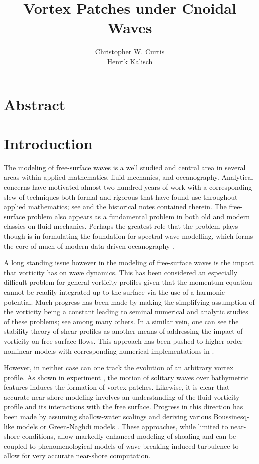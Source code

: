 \documentclass[a4paper,11pt]{article}
\title{Vortex Patches under Cnoidal Waves}
\author{Christopher W. Curtis\\
Henrik Kalisch}
\date{}
\begin{document}
\maketitle
\section*{Abstract}

\section{Introduction}
The modeling of free-surface waves is a well studied and central area in several areas within applied mathematics, fluid mechanics, and oceanography.  Analytical concerns have motivated almost two-hundred years of work with a corresponding slew of techniques both formal and rigorous that have found use throughout applied mathematics; see \cite{constantin} and the historical notes contained therein.  The free-surface problem also appears as a fundamental problem in both old \cite{lamb} and modern \cite{kundu} classics on fluid mechanics. Perhaps the greatest role that the problem plays though is in formulating the foundation for spectral-wave modelling, which forms the core of much of modern data-driven oceanography \cite{holthuijsen}.

A long standing issue however in the modeling of free-surface waves is the impact that vorticity has on wave dynamics.  This has been considered an especially difficult problem for general vorticity profiles given that the momentum equation cannot be readily integrated up to the surface via the use of a harmonic potential.  Much progress has been made by making the simplifying assumption of the vorticity being a constant leading to seminal numerical and analytic studies of these problems; see \cite{constantin,pullin1,simmen,dasilva} among many others.  In a similar vein, one can see the stability theory of shear profiles \cite{craik2,craik3,drazen,phillips1} as another means of addressing the impact of vorticity on free surface flows.  This approach has been pushed to higher-order-nonlinear models with corresponding numerical implementations in \cite{nwogu2}.

However, in neither case can one track the evolution of an arbitrary vortex profile.  As shown in experiment \cite{liu1,liu2,lin}, the motion of solitary waves over bathymetric features induces the formation of vortex patches.  Likewise, it is clear that accurate near shore modeling involves an understanding of the fluid vorticity profile and its interactions with the free surface.  Progress in this direction has been made by assuming shallow-water scalings and deriving various Boussinesq-like models \cite{nwogu1,chen,zhang} or Green-Naghdi models \cite{Lannes2014_1,Lannes2014_2,Lannes2016_1}.  These approaches, while limited to near-shore conditions, allow markedly enhanced modeling of shoaling and can be coupled to phenomenological models of wave-breaking induced turbulence to allow for very accurate near-shore computation.  
\end{document}
